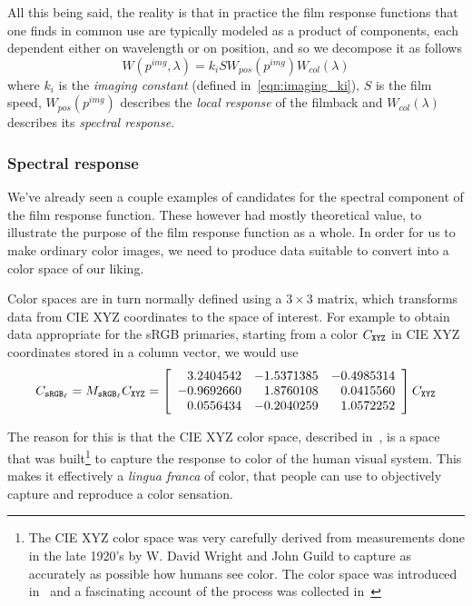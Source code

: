 All this being said, the reality is that in practice the film response functions 
that one finds in common use are typically modeled as a product of
components, each dependent either on wavelength or on position, 
and so we decompose it as follows
\begin{equation}
W(p^{img},\lambda) = k_i S W_{pos}(p^{img}) W_{col}(\lambda)
\end{equation}
where $k_i$ is the \textsl{imaging constant} (defined in~\cref{eqn:imaging_ki}), 
$S$ is the \gls{film speed},
$W_{pos}(p^{img})$ describes the \textsl{local response} of the filmback and
$W_{col}(\lambda)$ describes its \textsl{spectral response}.

\subsubsection{Spectral response}
We've already seen a couple examples of candidates for the spectral component
of the \gls{film response function}. These however had mostly theoretical value,
to illustrate the purpose of the film response function as a whole.
In order for us to make ordinary color images, we need to produce data
suitable to convert into a color space of our liking.

Color spaces are in turn normally defined using a $3\times3$ matrix, which
transforms data from \gls{CIE} \gls{XYZ} coordinates to the space of interest. 
For example to obtain data appropriate for the \gls{sRGB} primaries, starting from
a color $C_{\texttt{XYZ}}$ in \gls{CIE} \gls{XYZ} coordinates stored in a column vector, 
we would use
\begin{displaymath}
	C_{\sRGBl} = M_{\sRGBl} C_{\XYZ} = \left[\begin{array}{r@{.}lr@{.}lr@{.}l}
		3&2404542 & -1&5371385 & -0&4985314 \\
		-0&9692660 &  1&8760108 &  0&0415560 \\
		0&0556434 & -0&2040259 &  1&0572252 \\
	\end{array}\right] C_{\XYZ}
\end{displaymath}

The reason for this is that the \gls{CIE} \gls{XYZ} color space, described in~\cite{cie:015.2018},
is a space that was built\footnote{
	The \gls{CIE} \gls{XYZ} color space was very carefully derived from measurements
	done in the late 1920's by W. David Wright and John Guild to capture 
	as accurately as possible how humans see color. 
	The color space was introduced in~\cite{smithguild1931} and 
	a fascinating account of the process was collected in~\cite{fairman97} 
} to capture the response to color of the human visual system. 
This makes it effectively a \emph{lingua franca} of color, that people can
use to objectively capture and reproduce a color sensation.

